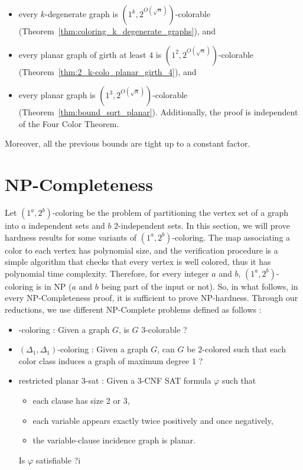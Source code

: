 \documentclass{article}
\newcommand{\colo}[2]{(1^{#1}, 2^{#2})}
\begin{document}
 \begin{itemize}
     \item every $k$-degenerate graph is $\colo{k}{O(\sqrt{n})}$-colorable (Theorem~\ref{thm:coloring_k_degenerate_graphs}), and
     \item every planar graph of girth at least $4$ is $\colo{2}{O(\sqrt{n})}$-colorable (Theorem~\ref{thm:2_k-colo_planar_girth_4}), and
     \item every planar graph is $\colo{3}{O(\sqrt{n})}$-colorable (Theorem~\ref{thm:bound_sqrt_planar}). Additionally, the proof is independent of the Four Color Theorem.
 \end{itemize}
 Moreover, all the previous bounds are tight up to a constant factor. 

\section{NP-Completeness}\label{sec:NPC}

Let {\sc $\colo{a}{b}$-coloring} be the problem of partitioning the vertex set of a graph into $a$ independent sets and $b$ $2$-independent sets. In this section, we will prove hardness results for some variants of {\sc$\colo{a}{b}$-coloring}. The map associating a color to each vertex has polynomial size, and the verification procedure is a simple algorithm that checks that every vertex is well colored, thus it has polynomial time complexity. Therefore, for every integer $a$ and $b$, {\sc$\colo{a}{b}$-coloring} is in NP ($a$ and $b$ being part of the input or not). So, in what follows, in every NP-Completeness proof, it is sufficient to prove NP-hardness. 
Through our reductions, we use different NP-Complete problems defined as follows :
\begin{itemize}
    \item {-coloring} : Given a graph $G$, is $G$ $3$-colorable ?
    \item {\sc $(\Delta_1, \Delta_1)$-coloring} : Given a graph $G$, can $G$ be $2$-colored such that each color class induces a graph of maximum degree $1$ ?
    \item {\sc restricted planar 3-sat} : Given a $3$-CNF SAT formula $\varphi$ such that
    \begin{itemize}
     \item each clause has size 2 or 3,
     \item each variable appears exactly twice positively and once negatively,
     \item the variable-clause incidence graph is planar.
    \end{itemize}
    Is $\varphi$ satisfiable ?i
\end{itemize}
\end{document}
